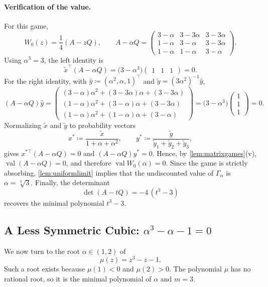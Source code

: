 \documentclass[11pt, a4paper]{article}
\theoremstyle{plain}
\theoremstyle{definition}
\DeclareMathOperator{\val}{val}
\newcommand{\defas}{\coloneqq}
\begin{document}
\paragraph{Verification of the value.}
For this game,
\[
W_0(z)=\frac14(A-zQ),
\qquad
A-\alpha Q=
\begin{pmatrix}
3-\alpha&3-3\alpha&3-3\alpha\\
1-\alpha&3-\alpha&3-3\alpha\\
1-\alpha&1-\alpha&3-\alpha
\end{pmatrix}.
\]
Using $\alpha^3=3$, the left identity is
\[
\tilde x^{\top}(A-\alpha Q)=\bigl(3-\alpha^3\bigr)\begin{pmatrix}1&1&1\end{pmatrix}=0 .
\]
For the right identity, with $\hat y\defas(\alpha^2,\alpha,1)^{\top}$ and $\tilde y=(3\alpha^2)^{-1}\hat y$,
\[
(A-\alpha Q)\hat y=
\begin{pmatrix}
(3-\alpha)\alpha^2+(3-3\alpha)\alpha+(3-3\alpha)\\
(1-\alpha)\alpha^2+(3-\alpha)\alpha+(3-3\alpha)\\
(1-\alpha)\alpha^2+(1-\alpha)\alpha+(3-\alpha)
\end{pmatrix}
=\bigl(3-\alpha^3\bigr)\begin{pmatrix}1\\1\\1\end{pmatrix}=0 .
\]
Normalizing $\tilde x$ and $\tilde y$ to probability vectors
\[
x^*\defas \frac{\tilde x}{1+\alpha+\alpha^2},
\qquad
y^*\defas \frac{\tilde y}{\tilde y_1+\tilde y_2+\tilde y_3},
\]
gives $x^{*\top}(A-\alpha Q)=0$ and $(A-\alpha Q)y^*=0$. Hence, by \cref{lem:matrixgames}(v), $\val(A-\alpha Q)=0$, and therefore $\val W_0(\alpha)=0$. Since the game is strictly absorbing, \cref{lem:uniformlimit} implies that the undiscounted value of $\Gamma_\alpha$ is $\alpha=\sqrt[3]3$. Finally, the determinant
\[
\det(A-tQ)=-4\,(t^3-3)
\]
recovers the minimal polynomial $t^3-3$.

\subsection{\texorpdfstring{A Less Symmetric Cubic: $\alpha^3-\alpha-1=0$}{A Less Symmetric Cubic: alpha cubed minus alpha minus 1 equals 0}}

We now turn to the root $\alpha\in(1,2)$ of
\[
\mu(z)=z^3-z-1 .
\]
Such a root exists because $\mu(1)<0$ and $\mu(2)>0$. The polynomial $\mu$ has no rational root, so it is the minimal polynomial of $\alpha$ and $m=3$.
\end{document}
